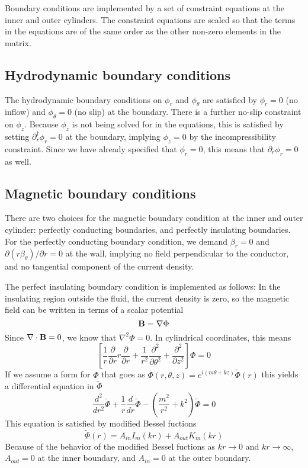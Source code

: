 \documentclass[letterpaper]{article}
\begin{document}
Boundary conditions are implemented by a set of constraint equations
at the inner and outer cylinders. The constraint equations are scaled
so that the terms in the equations are of the same order as the other
non-zero elements in the matrix.

\subsection{Hydrodynamic boundary conditions}

The hydrodynamic boundary conditions on $\phi_r$ and $\phi_\theta$ are
satisfied by $\phi_r = 0$ (no inflow) and $\phi_\theta = 0$ (no slip)
at the boundary.  There is a further no-slip constraint on $\phi_z$.
Because $\phi_z$ is not being solved for in the equations, this is
satisfied by setting $\partial_r^\dagger \phi_r = 0$ at the boundary,
implying $\phi_z=0$ by the incompressibility constraint. Since we have
already specified that $\phi_r=0$, this means that $\partial_r
\phi_r=0$ as well.

\subsection{Magnetic boundary conditions}

There are two choices for the magnetic boundary condition at the inner
and outer cylinder: perfectly conducting boundaries, and perfectly
insulating boundaries.  For the perfectly conducting boundary
condition, we demand $\beta_r = 0$ and $\partial (r
\beta_\theta)/\partial r = 0$ at the wall, implying no field
perpendicular to the conductor, and no tangential component of the
current density.

The perfect insulating boundary condition is implemented as follows:
In the insulating region outside the fluid, the current density is
zero, so the magnetic field can be written in terms of a scalar
potential
\begin{equation}
{\bf B} = {\bf \nabla}\Phi
\end{equation}
Since ${\bf \nabla}\cdot{\bf B} = 0$, we know that $\nabla^2 \Phi = 0$.  In cylindrical coordinates, this means
\begin{equation}
\left[\frac{1}{r}\frac{\partial}{\partial r}r\frac{\partial}{\partial r} + \frac{1}{r^2}\frac{\partial^2}{\partial\theta^2} +\frac{\partial^2}{\partial z^2}\right]\Phi = 0
\end{equation}
If we assume a form for $\Phi$ that goes as $\Phi(r,\theta,z) = e^{i(m\theta + k z)}\tilde{\Phi}(r)$
this yields a differential equation in $\tilde{\Phi}$
\begin{equation}
\frac{d^2}{d r^2}\tilde{\Phi} + \frac{1}{r}\frac{d}{dr}\tilde{\Phi} - \left(\frac{m^2}{r^2} + k^2\right)\tilde{\Phi} = 0
\end{equation}
This equation is satisfied by modified Bessel fuctions
\begin{equation}
\tilde{\Phi}(r) = A_{in} I_m (k r) + A_{out} K_m (k r)
\end{equation}
Because of the behavior of the modified Bessel fuctions as $k r
\rightarrow 0$ and $k r \rightarrow \infty$, $A_{out} = 0$ at the
inner boundary, and $A_{in} = 0$ at the outer boundary.
\end{document}

